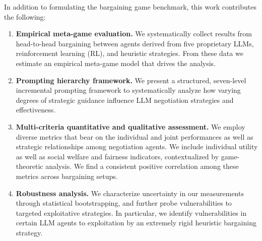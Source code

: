 \documentclass{article}
\theoremstyle{plain}
\theoremstyle{definition}
\theoremstyle{remark}
\begin{document}
In addition to formulating the bargaining game benchmark, this work contributes the following:
\begin{enumerate}
\item \textbf{Empirical meta-game evaluation.}
We systematically collect results from head-to-head bargaining between agents derived from five proprietary LLMs, reinforcement learning (RL), and heuristic strategies. 
From these data we estimate an empirical meta-game model that drives the analysis.
\item \textbf{Prompting hierarchy framework.} We present a structured, seven-level incremental prompting framework to systematically analyze how varying degrees of strategic guidance influence LLM negotiation strategies and effectiveness.
\item \textbf{Multi-criteria quantitative and qualitative assessment.} 
We employ diverse metrics that bear on the individual and joint performances as well as strategic relationships among negotiation agents.
We include individual utility as well as social welfare and fairness indicators, contextualized by game-theoretic analysis.
We find a consistent positive correlation among these metrics across bargaining setups.  
\item \textbf{Robustness analysis.} 
We characterize uncertainty in our measurements through statistical bootstrapping, and further probe vulnerabilities to targeted exploitative strategies.
In particular, we identify vulnerabilities in certain LLM agents to exploitation by an extremely rigid heuristic bargaining strategy.
\end{enumerate}
\end{document}
